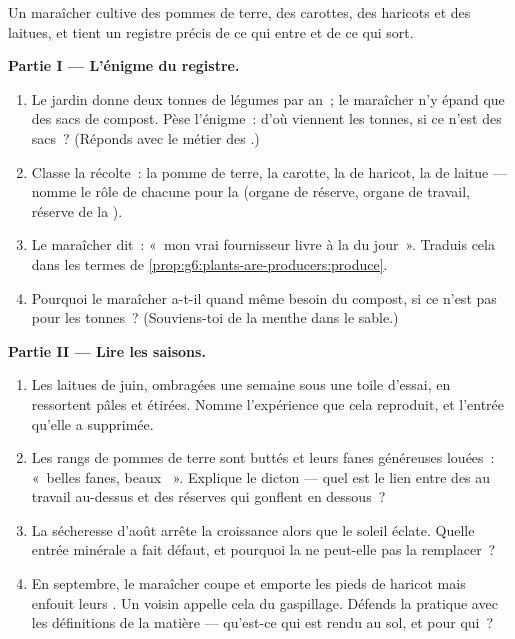 \begin{problem}\label{pb:g6:plants-are-producers:1}
Un maraîcher cultive des pommes de terre, des carottes, des haricots
et des laitues, et tient un registre précis de ce qui entre et de ce
qui sort.

\medskip\noindent\textbf{Partie I --- L'énigme du registre.}
\begin{enumerate}
  \item Le jardin donne deux tonnes de légumes par an~; le
        maraîcher n'y épand que des sacs de compost. Pèse
        l'énigme~: d'où viennent les tonnes, si ce n'est des sacs~?
        (Réponds avec le métier des .)
  \item Classe la récolte~: la pomme de terre, la carotte, la
         de haricot, la  de laitue --- nomme le rôle
        de chacune pour la  (organe de réserve, organe de
        travail, réserve de la ).
  \item Le maraîcher dit~: «~mon vrai fournisseur livre à la
         du jour~». Traduis cela dans les termes de
        \cref{prop:g6:plants-are-producers:produce}.
  \item Pourquoi le maraîcher a-t-il quand même besoin du compost,
        si ce n'est pas pour les tonnes~? (Souviens-toi de la
        menthe dans le sable.)
\end{enumerate}

\medskip\noindent\textbf{Partie II --- Lire les saisons.}
\begin{enumerate}[resume]
  \item Les laitues de juin, ombragées une semaine sous une toile
        d'essai, en ressortent pâles et étirées. Nomme l'expérience
        que cela reproduit, et l'entrée qu'elle a supprimée.
  \item Les rangs de pommes de terre sont buttés et leurs fanes
        généreuses louées~: «~belles fanes, beaux ~».
        Explique le dicton --- quel est le lien entre des 
        au travail au-dessus et des réserves qui gonflent en
        dessous~?
  \item La sécheresse d'août arrête la croissance alors que le
        soleil éclate. Quelle entrée minérale a fait défaut, et
        pourquoi la  ne peut-elle pas la remplacer~?
  \item En septembre, le maraîcher coupe et emporte les pieds de
        haricot mais enfouit leurs . Un voisin appelle cela
        du gaspillage. Défends la pratique avec les définitions de
        la matière --- qu'est-ce qui est rendu au sol, et pour qui~?
\end{enumerate}


\end{problem}
